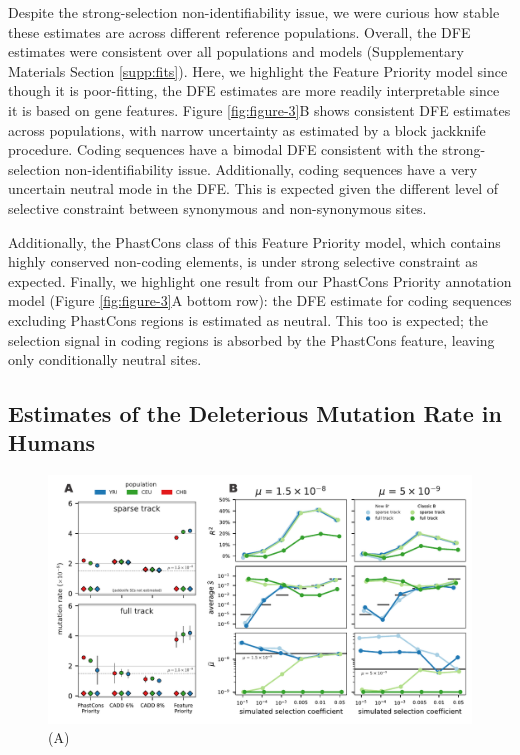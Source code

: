 \documentclass[11pt]{article}
\begin{document}
Despite the strong-selection non-identifiability issue, we were curious how
stable these estimates are across different reference populations. Overall, the
DFE estimates were consistent over all populations and models (Supplementary
Materials Section \ref{supp:fits}). Here, we highlight the Feature Priority
model since though it is poor-fitting, the DFE estimates are more readily
interpretable since it is based on gene features. Figure \ref{fig:figure-3}B
shows consistent DFE estimates across populations, with narrow uncertainty as
estimated by a block jackknife procedure. Coding sequences have a bimodal DFE
consistent with the strong-selection non-identifiability issue. Additionally,
coding sequences have a very uncertain neutral mode in the DFE. This is
expected given the different level of selective constraint between synonymous
and non-synonymous sites. 

Additionally, the PhastCons class of this Feature Priority model, which
contains highly conserved non-coding elements, is under strong selective
constraint as expected. Finally, we highlight one result from our PhastCons
Priority annotation model (Figure \ref{fig:figure-3}A bottom row): the DFE
estimate for coding sequences excluding PhastCons regions is estimated as
neutral. This too is expected; the selection signal in coding regions is
absorbed by the PhastCons feature, leaving only conditionally neutral sites.

\subsection*{Estimates of the Deleterious Mutation Rate in Humans}

\begin{figure}[htbp] 
    \centering
    \includegraphics[width=\textwidth]{figures/figure_4.pdf} 
    \caption{(A) }
  \label{fig:figure-4}
\end{figure}
\end{document}
